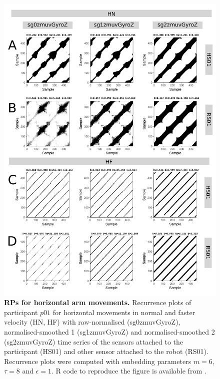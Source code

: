 \begin{figure}
\centering
\includegraphics[height=0.85\textheight]{rp_aH}
\caption{
	{\bf RPs for horizontal arm movements.}	
	Recurrence plots %
	of participant $p01$ for horizontal movements in normal and faster 
	velocity (HN, HF) with raw-normalised (sg0zmuvGyroZ), 
	normalised-smoothed 1 (sg1zmuvGyroZ) and 
	normalised-smoothed 2 (sg2zmuvGyroZ) time series of the 
	sensors attached to the participant (HS01) and other sensor 
	attached to the robot (RS01).
	Recurrence plots were computed with 
	embedding parameters $m=6$, $\tau=8$ and $\epsilon=1$.
	R code to reproduce the figure is available from \cite{hwum2018}.
        }
    \label{fig:rp_aH}
\end{figure}
